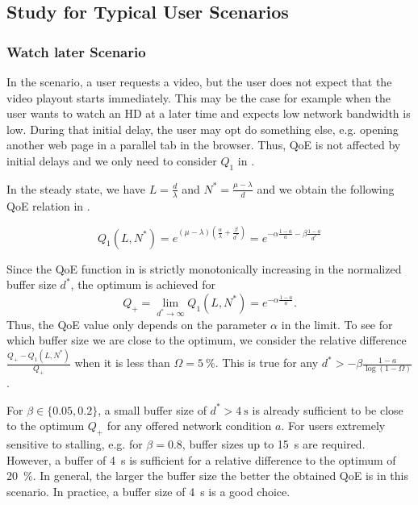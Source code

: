 \subsection{ Study for Typical User Scenarios}\label{sec:application:qoe_user_behaviour:typical_user_scenarios}

\subsubsection*{Watch later Scenario}\label{sec:application:qoe_user_behaviour:typical_user_scenarios:watch_later}
In the \watchLater scenario, a user requests a video, but the user does not expect that the video playout starts immediately. 
This may be the case for example when the user wants to watch an HD at a later time and expects low network bandwidth is low. 
During that initial delay, the user may opt do something else, e.g. opening another web page in a parallel tab in the browser.
Thus, \gls{QoE} is not affected by initial delays and we only need to consider \(Q_1\) in .

In the steady state, we have \(L=\frac{d}{\lambda}\) and \(N^*=\frac{\mu-\lambda}{d}\) and we obtain the following QoE relation in . 

\begin{equation}
   Q_1(L,N^*) = e^{\left(\mu-\lambda\right)(\frac{\alpha}{\lambda} +\frac{\beta}{d^*})}
	 = e^{-\alpha \frac{1-a}{a} - \beta \frac{1-a}{d^*}}
\label{eq:application:qoe_user_behaviour:typical_user_scenarios:stalling_steady_state}
\end{equation}

Since the \gls{QoE} function in  is strictly monotonically increasing in the normalized buffer size \(d^*\), the optimum is achieved for 
\[Q_+=\lim\limits_{d^* \to \infty} Q_1(L,N^*)=e^{-\alpha \frac{1-a}{a}}.\]
Thus, the QoE value only depends on the parameter \(\alpha\) in the limit.
To see for which buffer size we are close to the optimum, we consider the relative difference \(\frac{Q_+-Q_1(L,N^*)}{Q_+}\) when it is less than \(\Omega=\SI{5}{\percent}\).
This is true for any \(d^*> -\beta \frac{1-a}{\log\left(1-\Omega\right)}\). 

For \(\beta \in \{0.05,0.2\}\), a small buffer size of \(d^*>\SI{4}{\second}\) is already sufficient to be close to the optimum \(Q_+\) for any offered network condition \(a\).
For users extremely sensitive to stalling, e.g. for \(\beta=0.8\), buffer sizes up to \SI{15}{\second} are required.
However, a buffer of \SI{4}{\second} is sufficient for a relative difference to the optimum of \SI{20}{\percent}. 
In general, the larger the buffer size the better the obtained \gls{QoE} is in this scenario. In practice, a buffer size of \SI{4}{\second} is a good choice.

